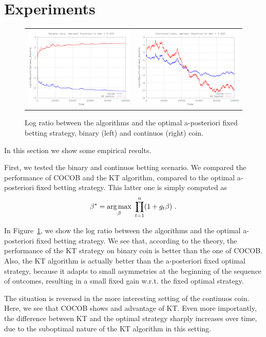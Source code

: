 \section{Experiments}
\label{sec:exp}

\begin{figure}[t]
\begin{tabular}{cc}
\includegraphics[width=0.45\linewidth]{code/binary_coin.png} &
\includegraphics[width=0.45\linewidth]{code/continuos_coin.png}
\end{tabular}
\caption{Log ratio between the algorithms and the optimal a-posteriori fixed betting strategy, binary (left) and continuos (right) coin.}
\label{fig:bin_cont_coin}
\end{figure}

In this section we show some empirical results.

First, we tested the binary and continuos betting scenario. We compared the performance of \ac{COCOB} and the \ac{KT} algorithm, compared to the optimal a-posteriori fixed betting strategy. This latter one is simply computed as
\[
\beta^*=\operatorname*{arg\,max}_{\beta} \ \prod_{t=1}^n (1+g_t \beta)~.
\]

In Figure~\ref{fig:bin_cont_coin}, we show the log ratio between the algorithms and the optimal a-posteriori fixed betting strategy. We see that, according to the theory, the performance of the \ac{KT} strategy on binary coin is better than the one of \ac{COCOB}. Also, the \ac{KT} algorithm is actually better than the a-posteriori fixed optimal strategy, because it adapts to small asymmetries at the beginning of the sequence of outcomes, resulting in a small fixed gain w.r.t. the fixed optimal strategy.

The situation is reversed in the more interesting setting of the continuos coin. Here, we see that \ac{COCOB} shows and advantage of \ac{KT}. Even more importantly, the difference between \ac{KT} and the optimal strategy sharply increases over time, due to the suboptimal nature of the \ac{KT} algorithm in this setting.